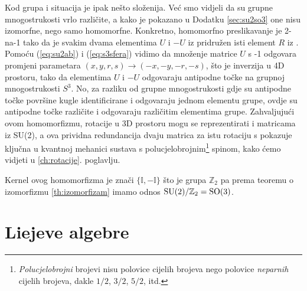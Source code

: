 Kod grupa  i  situacija je ipak nešto složenija. Već smo vidjeli
da su grupne mnogostrukosti vrlo različite, a kako je
pokazano u Dodatku \ref{sec:su2so3} one
nisu izomorfne, nego samo homomorfne.
Konkretno, homomorfno preslikavanje je 2-na-1 tako da je svakim dvama elementima 
$U$ i $-U$ iz  pridružen isti element $R$ iz .
Pomoću (\ref{eq:su2ab}) i (\ref{eq:s3sfera}) vidimo da množenje matrice $U$
s -1 odgovara promjeni parametara $(x, y, r, s) \to (-x, -y, -r, -s)$,
što je inverzija u 4D prostoru, tako da elementima $U$ i $-U$ odgovaraju
antipodne točke na grupnoj mnogostrukosti $S^3$. No, za razliku od
grupne mnogostrukosti  gdje su antipodne točke površine kugle
identificirane i odgovaraju jednom elementu grupe, ovdje su antipodne
točke različite i odgovaraju različitim elementima grupe.
Zahvaljujući ovom homomorfizmu, rotacije u 3D prostoru mogu se reprezentirati
i matricama iz SU(2), a ova prividna redundancija dvaju matrica za
istu rotaciju s pokazuje ključna u kvantnoj mehanici sustava s
polucjelobrojnim\footnote{\emph{Polucjelobrojni} brojevi nisu polovice
    cijelih brojeva nego polovice \emph{neparnih} cijelih brojeva,
dakle $1/2$, $3/2$, $5/2$, itd. } spinom,
kako ćemo vidjeti u \ref{ch:rotacije}. poglavlju.

Kernel ovog homomorfizma je znači $\{\mathbb{I}, -\mathbb{I}\}$ što je
grupa $\mathbb{Z}_2$ pa prema
teoremu o izomorfizmu \ref{th:izomorfizam} imamo
odnos $\mathrm{SU}(2)/\mathbb{Z}_2 = \mathrm{SO}(3)$.





\section{Liejeve algebre}
\label{sec:liejevealgebre}

